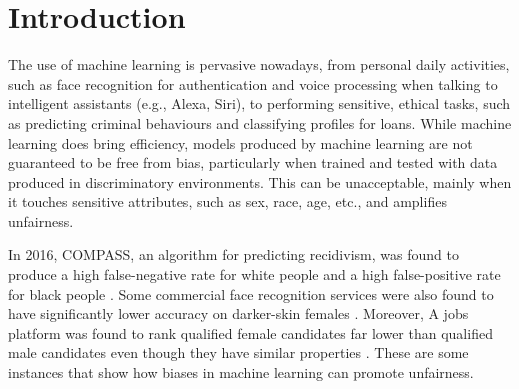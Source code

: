 \documentclass[sigconf,review]{acmart}
\begin{document}
	
	
	\maketitle
	
	\section{Introduction}
	\label{sec:introduction}
	The use of machine learning is pervasive nowadays, from personal daily activities, such as face recognition for authentication and voice processing when talking to intelligent assistants (e.g., Alexa, Siri), to performing sensitive, ethical tasks, such as predicting criminal behaviours and classifying profiles for loans. While machine learning does bring efficiency, models produced by machine learning are not guaranteed to be free from bias, particularly when trained and tested with data produced in discriminatory environments. This can be unacceptable, mainly when it touches sensitive attributes, such as sex, race, age, etc., and amplifies unfairness. 
	
	In 2016, COMPASS, an algorithm for predicting recidivism, was found to produce a high false-negative rate for white people and a high false-positive rate for black people \cite{angwin2016machine}. Some commercial face recognition services were also found to have significantly lower accuracy on darker-skin females \cite{buolamwini2018gender}. Moreover, A jobs platform was found to rank qualified female candidates far lower than qualified male candidates even though they have similar properties \cite{lahoti2019ifair}. These are some instances that show how biases in machine learning can promote unfairness. 
	
\end{document}
